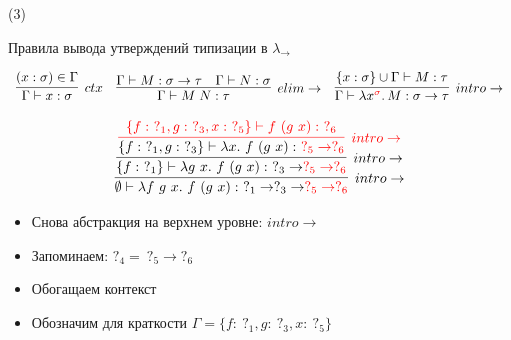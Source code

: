     \begin{frame}[t, noframenumbering]{\btypename (3)}
        \begin{block}{Правила вывода утверждений типизации в $\lambda_{\rightarrow}$}
            \vspace{-1em}
            \begin{center}
                \[
                    \begin{array}{l c r}
                        \infer[ctx]{\Gamma \vdash x: \sigma}{(x: \sigma) \in \Gamma}
                        &
                        \infer[elim\to]{\Gamma \vdash M\;N : \tau}{\Gamma \vdash M : \sigma \to \tau & \Gamma \vdash N : \sigma}
                        &
                        \infer[intro\to]{\Gamma \vdash \lambda x^{\color{red} \sigma}\ldotp M : \sigma \to \tau}{\{x : \sigma\} \cup \Gamma \vdash M : \tau}
                    \end{array}
                \]
            \end{center}
        \end{block}
        \[
            \infer[intro\to]{\emptyset \vdash \lambda f~g~x.~f~(g~x) :~ ?_1 \to ?_3 \to \color{red}?_5 \to ?_6}{
                \infer[intro\to]{\{f:~ ?_1\} \vdash \lambda g~x.~f~(g~x) :~ ?_3 \to \color{red}?_5 \to ?_6}{
                    \color{red}\infer[intro\to]{\color{black}\{f:~ ?_1, g:~ ?_3\} \vdash \lambda x.~f~(g~x) :~ \color{red}?_5 \to ?_6 }{
                            {\{f:~ ?_1, g:~ ?_3, x:~ ?_5\} \vdash f~(g~x) :~ ?_6 }
                    }}}
        \]
        \vspace{-1em}
        \begin{itemize}
            \item Снова абстракция на верхнем уровне: $intro\to$
            \item Запоминаем: $?_4 =~ ?_5 \to ?_6$
            \item Обогащаем контекст
            \item Обозначим для краткости $\Gamma = \{f:~ ?_1, g:~ ?_3, x:~ ?_5\}$
        \end{itemize}
    \end{frame}


